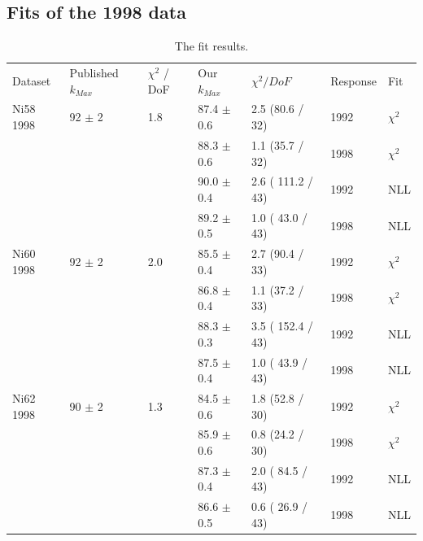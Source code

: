 \subsection { Fits of the 1998 data }
\begin{table}[H]
  \begin{center}
    \begin{tabular}{|l||l|l|l|l|l|l|}
      \hline
      Dataset & Published $k_{Max}$ & $\chi^2$ / DoF & Our $k_{Max}$ & $\chi^2 / DoF$  & Response & Fit \\
      \hhline{|=||=|=|=|=|=|=|}
       Ni58 1998 & 92   $\pm$ 2   & 1.8 & 87.4 $\pm$ 0.6 & 2.5 (80.6 / 32)  & 1992 & $\chi^2$ \\  
                 &                &     & 88.3 $\pm$ 0.6 & 1.1 (35.7 / 32)  & 1998 & $\chi^2$ \\  
                                                                           
                &                &     & 90.0 $\pm$ 0.4 & 2.6 ( 111.2 / 43) & 1992 & NLL \\
                &                &     & 89.2 $\pm$ 0.5 & 1.0 ( 43.0 / 43) & 1998 & NLL \\
      \hline                           
       Ni60 1998 & 92   $\pm$ 2   & 2.0 & 85.5 $\pm$ 0.4 & 2.7 (90.4 / 33)  & 1992 & $\chi^2$ \\  
                 &                &     & 86.8 $\pm$ 0.4 & 1.1 (37.2 / 33)  & 1998 & $\chi^2$ \\  
                                                                           
                &                &     & 88.3 $\pm$ 0.3 & 3.5 ( 152.4 / 43) & 1992 & NLL \\
                &                &     & 87.5 $\pm$ 0.4 & 1.0 ( 43.9 / 43) & 1998 & NLL \\
      \hline                           
       Ni62 1998 & 90   $\pm$ 2   & 1.3 & 84.5 $\pm$ 0.6 & 1.8 (52.8 / 30)  & 1992 & $\chi^2$ \\  
                 &                &     & 85.9 $\pm$ 0.6 & 0.8 (24.2 / 30)  & 1998 & $\chi^2$ \\  
                                       
                &                &     & 87.3 $\pm$ 0.4 & 2.0 ( 84.5 / 43) & 1992 & NLL \\
                &                &     & 86.6 $\pm$ 0.5 & 0.6 ( 26.9 / 43) & 1998 & NLL \\
      \hline                           
    \end{tabular}
  \end{center}
  \caption{The fit results.}
  \label{table:fits1998}
\end{table}

